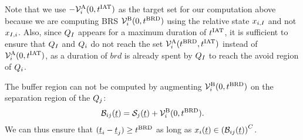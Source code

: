 Note that we use $-\mathcal{V}^{\text{A}}_{i}(0, t^\text{IAT})$ as the target set for our computation above because we are computing BRS $\mathcal{V}^{\text{B}}_{i}(0, t^\text{BRD})$ using the relative state $x_{i, I}$ and not $x_{I, i}$. Also, since $Q_{I}$ appears for a maximum duration of $t^\text{IAT}$, it is sufficient to ensure that $Q_{I}$ and $Q_i$ do not reach the set $\mathcal{V}^{\text{A}}_{i}(t^\text{BRD}, t^\text{IAT})$ instead of $\mathcal{V}^{\text{A}}_{i}(0, t^\text{IAT})$, as a duration of $brd$ is already spent by $Q_{I}$ to reach the avoid region of $Q_i$.

The buffer region can not be computed by augmenting $\mathcal{V}^{\text{B}}_{i}(0, t^\text{BRD})$ on the separation region of the $Q_j$:
\begin{equation} \label{eqn:buffRegion_case1}
\buff_{ij}(\tsa) = \sep_j(\tsa) + \brs^{\text{B}}_{i}(0, \brd).
\end{equation} 
We can thus ensure that $(\underline{t}_i - \underline{t}_j) \geq t^\text{BRD}$ as long as $x_i(\underline{t}) \in \left(\mathcal{B}_{ij}(\underline{t})\right)^C$.


